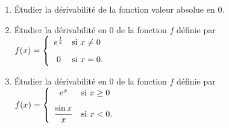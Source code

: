 \documentclass[a4paper, 11pt]{article}
\begin{document}
%
% 


\begin{exercice}
	\begin{enumerate}
		\item \'Etudier la d\'erivabilit\'e de la fonction valeur absolue en 0.
		\item \'Etudier la d\'erivabilit\'e en 0 de la fonction $f$ d\'efinie par $f(x)=\left\lbrace\begin{array}{cl}  e^{\frac {1}{x}} & \mathrm{si}\ x\not=0\vsec\\ 0 & \mathrm{si}\ x=0.   \end{array}\right.$\vsec
		\item \'Etudier la d\'erivabilit\'e en 0 de la fonction $f$ d\'efinie par $f(x)=\left\lbrace\begin{array}{cl}  e^{x} & \mathrm{si}\ x\geq 0\vsec\\ \ddp\frac{\sin{x}}{x} & \mathrm{si}\ x<0.   \end{array}\right.$
	\end{enumerate}
\end{exercice}



%
%
%
\end{document}
